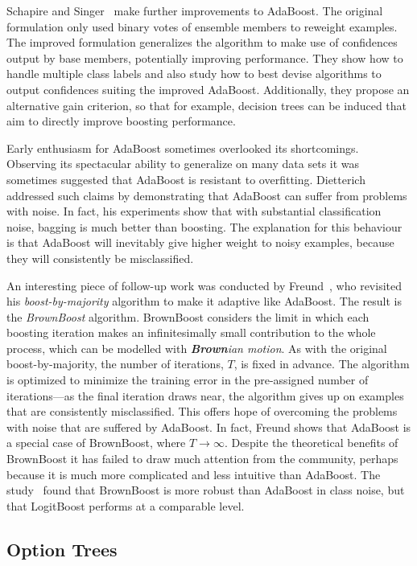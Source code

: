 Schapire and Singer~\cite{boostimproved} make further improvements to AdaBoost. The original formulation only used binary votes of ensemble members to
reweight examples. The improved formulation generalizes the algorithm to
make use of confidences output by base members, potentially improving
performance. They show how to handle multiple class labels and also study how to best devise algorithms to output confidences suiting the improved AdaBoost. Additionally, they propose an alternative gain criterion, so that for example, decision trees can be induced that aim to directly improve boosting performance.

Early enthusiasm for AdaBoost sometimes overlooked its shortcomings. Observing its spectacular ability to generalize on many data sets it was
sometimes suggested that AdaBoost is resistant to overfitting.
Dietterich~\cite{boostnoise} addressed such claims by demonstrating that AdaBoost can suffer from problems with noise. In fact, his experiments show that
with substantial classification noise, bagging is much better than
boosting. The explanation for this behaviour is that AdaBoost will
inevitably give higher weight to noisy examples, because they will
consistently be misclassified.

An interesting piece of follow-up work was conducted by Freund~\cite{brownboost}, who revisited his {\em boost-by-majority} algorithm to make it adaptive like AdaBoost. The result is the {\em BrownBoost} algorithm. BrownBoost considers the limit in which each boosting iteration makes an infinitesimally small contribution to the whole process, which can be modelled with {\it {\bf Brown}ian motion}. As with the original boost-by-majority, the number of iterations, $T$, is fixed in advance. The algorithm is optimized to minimize the training error in the pre-assigned number of iterations---as the final iteration draws near, the algorithm
gives up on examples that are consistently misclassified. This offers hope
of overcoming the problems with noise that are suffered by AdaBoost. In
fact, Freund shows that AdaBoost is a special case of BrownBoost, where $T
\to \infty$. Despite the theoretical benefits of BrownBoost it has
failed to draw much attention from the community, perhaps because it is
much more complicated and less intuitive than AdaBoost. The study~\cite{boost3exp} found that BrownBoost is more robust than AdaBoost in class noise, but that LogitBoost performs at a comparable level.


\subsection{Option Trees}
\label{sec:optiontreesbatch}

